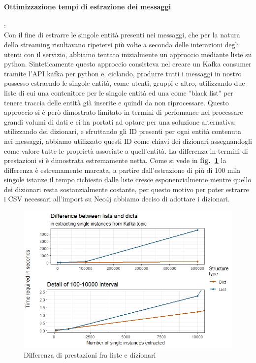 \documentclass[fleqn,10pt]{SelfArx} %
\begin{document}
{\paragraph{Ottimizzazione tempi di estrazione dei messaggi}:  \\ Con il fine di estrarre le singole entità presenti nei messaggi, che per la natura dello streaming risultavano ripetersi più volte a seconda delle interazioni degli utenti con il servizio, abbiamo tentato inizialmente un approccio mediante liste su python. Sinteticamente questo approccio consisteva nel creare un Kafka consumer tramite l'API kafka per python e, ciclando, produrre tutti i messaggi in nostro possesso estraendo le singole entità, come utenti, gruppi e altro, utilizzando due liste di cui una contenitore per le singole entità ed una come "black list" per tenere traccia delle entità già inserite e quindi da non riprocessare. Questo approccio si è però dimostrato limitato in termini di perfomance nel processare grandi volumi di dati e ci ha portati ad optare per una soluzione alternativa: utilizzando dei dizionari, e sfruttando gli ID presenti per ogni entità contenuta nei messaggi, abbiamo utilizzato questi ID come chiavi dei dizionari assegnandogli come valore tutte le proprietà associate a quell'entità. La differenza in termini di prestazioni si è dimostrata estremamente netta. Come si vede in \textbf{fig.~\ref{plot_lists_dicts}} la differenza è estremamente marcata, a partire dall'estrazione di più di 100 mila singole istanze il tempo richiesto dalle liste cresce esponenzialmente mentre quello dei dizionari resta sostanzialmente costante, per questo motivo per poter estrarre i CSV necessari all'import su Neo4j abbiamo deciso di adottare i dizionari.
\begin{figure}
\centering
\includegraphics[scale=0.54]{viz_benchmark_lists_dicts.jpeg}
\caption{\label{plot_lists_dicts} Differenza di prestazioni fra liste e dizionari}
\end{figure}
}
\end{document}
